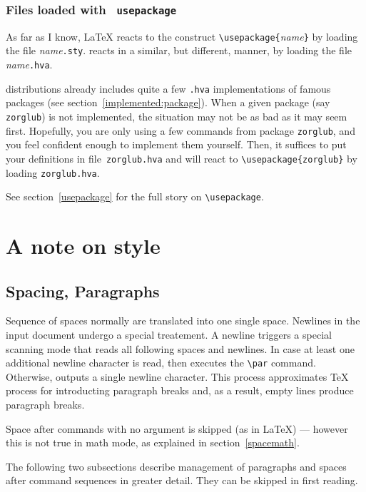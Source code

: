 \subsubsection{Files loaded with \texttt{ usepackage}}
As far as I know, \LaTeX{} reacts to the construct
\verb+\usepackage{+\textit{name}\verb+}+ by loading the file
\textit{name}\texttt{.sty}.
\hevea{} reacts in a similar, but different, manner, by
loading the file \textit{name}\texttt{.hva}.

\hevea{} distributions already includes quite a few \texttt{.hva}
implementations of famous packages (see section~\ref{implemented:package}).
When a given package (say  \texttt{zorglub}) is not implemented, the
situation may not be as bad as it may seem first.
Hopefully, you are only using a few commands from package
\texttt{zorglub}, and you feel confident enough to implement
them yourself.
Then, it suffices to put your definitions in file~\texttt{zorglub.hva}
and \hevea{} will react to \verb+\usepackage{zorglub}+ by loading
\texttt{zorglub.hva}.

See section~\ref{usepackage} for the full story on \verb+\usepackage+.


\section{A note on style}

\subsection{Spacing, Paragraphs}
Sequence of spaces normally are translated into one single space.
Newlines in the input document undergo a special treatement.
A newline triggers a special scanning mode that reads all following
spaces and newlines. In case at least one additional newline character
is read, then \hevea{} executes the \verb+\par+ command.
Otherwise, \hevea{} outputs a single newline character.
This process approximates \TeX{} process for introducting paragraph
breaks and, as a result, empty lines produce paragraph breaks.

Space after commands with no argument is skipped (as in \LaTeX{}) ---
however this is not true in math mode, as explained in
section~\ref{spacemath}.

The following two subsections describe management of paragraphs and
spaces after command sequences in greater detail.
They can be skipped in first reading.


